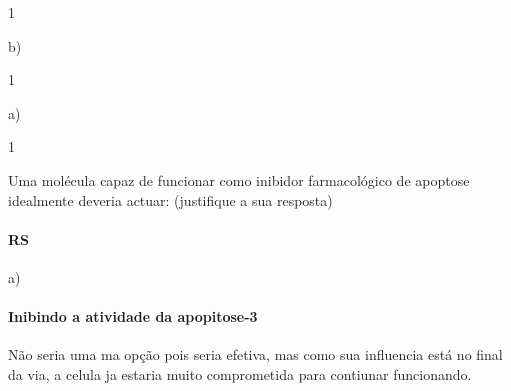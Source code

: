 \documentclass[\mainfilename]{subfiles}
\begin{document}
\begin{questionBox}1{} %
    
    b)
    
\end{questionBox}

\setcounter{question}{6}

\begin{questionBox}1{} %
    
    a)
    
\end{questionBox}

\begin{questionBox}1{} %
    
    Uma molécula capaz de funcionar como inibidor farmacológico de apoptose idealmente deveria actuar: (justifique a sua resposta)

    \paragraph*{RS} a)

    \paragraph*{Inibindo a atividade da apopitose-3}
    Não seria uma ma opção pois seria efetiva, mas como sua influencia está no final da via, a celula ja estaria muito comprometida para contiunar funcionando.
    
\end{questionBox}
\end{document}
